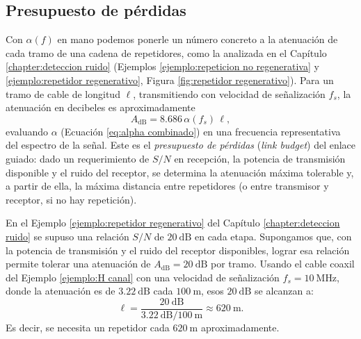 \subsection*{Presupuesto de pérdidas}

Con $\alpha(f)$ en mano podemos ponerle un número concreto a la atenuación de cada tramo de una cadena de repetidores, como la analizada en el Capítulo \ref{chapter:deteccion ruido} (Ejemplos \ref{ejemplo:repeticion no regenerativa} y \ref{ejemplo:repetidor regenerativo}, Figura \ref{fig:repetidor regenerativo}). Para un tramo de cable de longitud $\ell$, transmitiendo con velocidad de señalización $f_s$, la atenuación en decibeles es aproximadamente
\begin{equation*}
    A_{\mathrm{dB}} = 8.686\,\alpha(f_s)\,\ell,
\end{equation*}
evaluando $\alpha$ (Ecuación \eqref{eq:alpha combinado}) en una frecuencia representativa del espectro de la señal. Este es el \emph{presupuesto de pérdidas} (\emph{link budget}) del enlace guiado: dado un requerimiento de $S/N$ en recepción, la potencia de transmisión disponible y el ruido del receptor, se determina la atenuación máxima tolerable y, a partir de ella, la máxima distancia entre repetidores (o entre transmisor y receptor, si no hay repetición).

\begin{ejemplo}
En el Ejemplo \ref{ejemplo:repetidor regenerativo} del Capítulo \ref{chapter:deteccion ruido} se supuso una relación $S/N$ de $20\ \unit{\deci\bel}$ en cada etapa. Supongamos que, con la potencia de transmisión y el ruido del receptor disponibles, lograr esa relación permite tolerar una atenuación de $A_{\mathrm{dB}}=20\ \unit{\deci\bel}$ por tramo. Usando el cable coaxil del Ejemplo \ref{ejemplo:H canal} con una velocidad de señalización $f_s=10\ \unit{\mega\hertz}$, donde la atenuación es de $3.22\ \unit{\deci\bel}$ cada $100\ \unit{\meter}$, esos $20\ \unit{\deci\bel}$ se alcanzan a:
\begin{equation*}
    \ell = \frac{20\ \unit{\deci\bel}}{3.22\ \unit{\deci\bel}/100\ \unit{\meter}} \approx 620\ \unit{\meter}.
\end{equation*}
Es decir, se necesita un repetidor cada $620\ \unit{\meter}$ aproximadamente.
\end{ejemplo}

